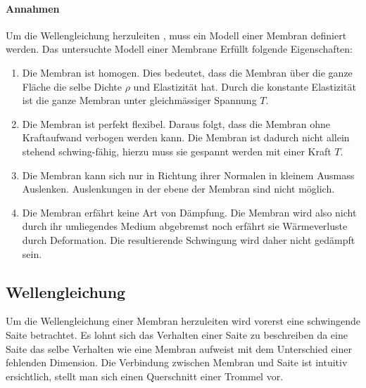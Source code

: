 \paragraph{Annahmen} 
Um die Wellengleichung herzuleiten \cite{kreismembran:wellengleichung_herleitung}, muss ein Modell einer Membran definiert werden. 
Das untersuchte Modell einer Membrane Erfüllt folgende Eigenschaften:
\begin{enumerate}[i]
	\item Die Membran ist homogen. 
	Dies bedeutet, dass die Membran über die ganze Fläche die selbe Dichte $ \rho $  und Elastizität hat. 
	Durch die konstante Elastizität ist die ganze Membran unter gleichmässiger Spannung $ T $.
	\item Die Membran ist perfekt flexibel. 
	Daraus folgt, dass die Membran ohne Kraftaufwand verbogen werden kann. 
	Die Membran ist dadurch nicht allein stehend schwing-fähig, hierzu muss sie gespannt werden mit einer Kraft $ T $.
	\item Die Membran kann sich nur in Richtung ihrer Normalen in kleinem Ausmass Auslenken.
	Auslenkungen in der ebene der Membran sind nicht möglich.
	\item Die Membran erfährt keine Art von Dämpfung. 
	Die Membran wird also nicht durch ihr umliegendes Medium abgebremst noch erfährt sie Wärmeverluste durch Deformation.
	Die resultierende Schwingung wird daher nicht gedämpft sein.
	
\end{enumerate}

\subsection{Wellengleichung} Um die Wellengleichung einer Membran herzuleiten wird vorerst eine schwingende Saite betrachtet.
Es lohnt sich das Verhalten einer Saite zu beschreiben da eine Saite das selbe Verhalten wie eine Membran aufweist mit dem Unterschied einer fehlenden Dimension.
Die Verbindung zwischen Membran und Saite ist intuitiv ersichtlich, stellt man sich einen Querschnitt einer Trommel vor.

